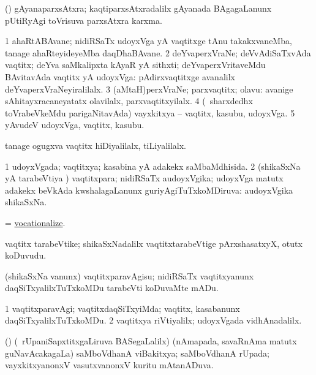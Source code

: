 \bentry
{}
\gl{\nA}
\expl{}
\bmng
 (\saM) gAyanaparxsAtxra; kaqtiparxsAtxradalilx gAyanada BAgagaLanunx pUtiRyAgi toVrisuva parxsAtxra karxma. 
\emng
\eentry

\bentry
{} 
\gl{\nA}
\expl{}
\bmng
\bnum
\num{1} ahaRtABAvane; nidiRSaTx udoyxVga yA vaqtitxge tAnu takakxvaneMba, tanage ahaRteyideyeMba daqDhaBAvane. 
\num{2} deYvaperxVraNe; deVvAdiSaTxvAda vaqtitx; deYva saMkalipxta kAyaR yA sithxti; deYvaperxVritaveMdu BAvitavAda vaqtitx yA udoyxVga:  pAdirxvaqtitxge avanalilx deYvaperxVraNeyiralilalx. 
\num{3} (aMtaH)perxVraNe; parxvaqtitx; olavu:  avanige sAhitayxracaneyatatx olavilalx, parxvaqtitxyilalx. 
\num{4} (\kanmu\ sharxdedhx toVrabeVkeMdu parigaNitavAda) vayxkitxya -- vaqtitx, kasubu, udoyxVga. 
\num{5} yAvudeV udoyxVga, vaqtitx, kasubu. 
\enum
\emng

\noindent 
\gl{\pagu}
\expl{}
\bmng
  tanage ogugxva vaqtitx hiDiyalilalx, tiLiyalilalx. 
\emng
\eentry

\bentry 
{} 
\gl{\gu}
\expl{}
\bmng
\bnum
\num{1} udoyxVgada; vaqtitxya; kasabina yA adakekx saMbaMdhisida. 
\num{2} (shikaSxNa yA tarabeVtiya \vi) vaqtitxpara; nidiRSaTx audoyxVgika; udoyxVga matutx adakekx beVkAda kwshalagaLanunx guriyAgiTuTxkoMDiruva:  audoyxVgika shikaSxNa. 
\enum
\emng
\eentry

\bentry
{} 
\gl{\sakirx}
\expl{}
\bmng
 = \hyperlink{vocationalize}{vocationalize}. 
\emng
\eentry

\bentry 
{} 
\gl{\nA}
\expl{}
\bmng
vaqtitx tarabeVtike; shikaSxNadalilx vaqtitxtarabeVtige pArxshasatxyX, otutx koDuvudu. 
\emng
\eentry

\bentry
{} 
\gl{\sakirx}
\expl{}
\bmng
 (shikaSxNa \mo vanunx) vaqtitxparavAgisu; nidiRSaTx vaqtitxyanunx daqSiTxyalilxTuTxkoMDu tarabeVti koDuvaMte mADu. 
\emng
\eentry

\bentry
{} 
\gl{\kirxvi}
\expl{}
\bmng
\bnum
\num{1} vaqtitxparavAgi; vaqtitxdaqSiTxyiMda; vaqtitx, kasabanunx daqSiTxyalilxTuTxkoMDu. 
\num{2} vaqtitxya riVtiyalilx; udoyxVgada vidhAnadalilx. 
\enum
\emng
\eentry

\bentry
{} 
\gl{\gu}
\expl{}
\bmng
 (\vAyx) (\kanmu\ rUpaniSapxtitxgaLiruva BASegaLalilx) (nAmapada, savaRnAma matutx guNavAcakagaLa) saMboVdhanA viBakitxya; saMboVdhanA rUpada; vayxkitxyanonxV vasutxvanonxV kuritu mAtanADuva. 
\emng
\eentry

